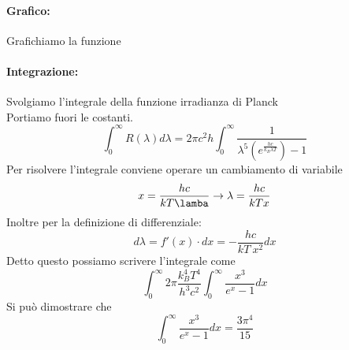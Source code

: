 \documentclass{article}
\begin{document}
\paragraph{ Grafico:} Grafichiamo la funzione
\\

\begin{figure}[h]
\centering
{}
\end{figure}

\vspace*{-0.10in}
\paragraph{Integrazione:} Svolgiamo l'integrale della funzione irradianza di Planck \\
Portiamo fuori le costanti. 
\[ \int_0^\infty R(\lambda )d\lambda = 2\pi c^2h \int_0^\infty \frac{1}{\lambda^5(e^\frac{hc}{k_B\lambda T})-1}\] 
Per risolvere l'integrale conviene operare un cambiamento di variabile 
\[ x = \frac{hc}{kT\lamba} \to \lambda = \frac{hc}{kTx} \]
Inoltre per la definizione di differenziale:
\[ d \lambda = f'(x) \cdot dx  = - \frac{hc}{kT \ x^2} dx\]
Detto questo possiamo scrivere l'integrale come 
\[ \int_0^\infty 2\pi \frac{k_B^4 T^4}{h^3 c^2} \int_0^\infty \frac{x^3}{e^x-1}dx\]
Si può dimostrare che
\[ \int_0^\infty \frac{x^3}{e^x-1}dx = \frac {3 \pi^4}{15}\]
\end{document}
